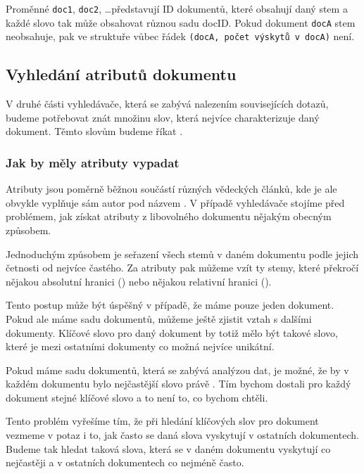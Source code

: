 \documentclass[12pt]{article}
\newcommand{\code}[1]{\texttt{#1}}
\begin{document}
Proměnné \code{doc1}, \code{doc2}, \dots představují ID dokumentů, které obsahují daný stem a každé slovo tak může obsahovat různou sadu docID. Pokud dokument \code{docA} stem neobsahuje, pak ve struktuře vůbec řádek \code{(docA, počet výskytů v docA)} není. 

\subsection{Vyhledání atributů dokumentu} 

V druhé části vyhledávače, která se zabývá nalezením souvisejících dotazů, budeme potřebovat znát množinu slov, která nejvíce charakterizuje daný dokument. Těmto slovům budeme říkat . 

\subsubsection{Jak by měly atributy vypadat}

Atributy jsou poměrně běžnou součástí různých vědeckých článků, kde je ale obvykle vyplňuje sám autor pod názvem . V případě vyhledávače stojíme před problémem, jak získat atributy z libovolného dokumentu nějakým obecným způsobem. 

Jednoduchým způsobem je seřazení všech stemů v daném dokumentu podle jejich četnosti od nejvíce častého. Za atributy pak můžeme vzít ty stemy, které překročí nějakou absolutní hranici () nebo nějakou relativní hranici (). 

Tento postup může být úspěšný v případě, že máme pouze jeden dokument. Pokud ale máme sadu dokumentů, můžeme ještě zjistit vztah s dalšími dokumenty. Klíčové slovo pro daný dokument by totiž mělo být takové slovo, které je mezi ostatními dokumenty co možná nejvíce unikátní. 

Pokud máme sadu dokumentů, která se zabývá analýzou dat, je možné, že by v každém dokumentu bylo nejčastější slovo právě . Tím bychom dostali pro každý dokument stejné klíčové slovo a to není to, co bychom chtěli. 

Tento problém vyřešíme tím, že při hledání klíčových slov pro dokument vezmeme v potaz i to, jak často se daná slova vyskytují v ostatních dokumentech. Budeme tak hledat taková slova, která se v daném dokumentu vyskytují co nejčastěji a v ostatních dokumentech co nejméně často. 
\end{document}
